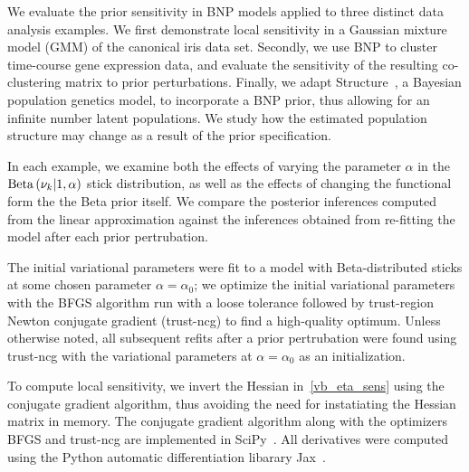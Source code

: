 We evaluate the prior sensitivity in BNP models applied to three distinct data analysis examples.
We first demonstrate local sensitivity in a Gaussian mixture model (GMM) of the canonical iris data set.
Secondly, we use BNP to cluster time-course gene expression data,
and evaluate the sensitivity of the resulting co-clustering matrix to prior perturbations.
Finally, we adapt Structure~\citep{pritchard:2000:structure}, a Bayesian population genetics model,
to incorporate a BNP prior, thus allowing for
an infinite number latent populations.
We study how the estimated population structure may change as a
result of the prior specification.

In each example, we examine both the effects of varying the parameter $\alpha$
in the $\mathrm{Beta}\left(\nu_{k} \vert 1, \alpha\right)$ stick distribution, as well as
the effects of changing the functional form the the Beta prior itself.
We compare the posterior inferences computed from the linear approximation against
the inferences obtained from re-fitting the model after each prior pertrubation.

The initial variational parameters were fit to a model
with Beta-distributed sticks at some chosen parameter $\alpha = \alpha_0$;
we optimize the initial variational parameters with
the BFGS algorithm run with a loose tolerance
followed by trust-region Newton conjugate gradient (trust-ncg) to find a high-quality optimum.
Unless otherwise noted, all subsequent refits after a prior pertrubation were found
using trust-ncg with the variational parameters at $\alpha = \alpha_0$ as an initialization.

To compute local sensitivity, we invert the Hessian in~\eqref{vb_eta_sens} using
the conjugate gradient algorithm, thus avoiding the need for
instatiating the Hessian matrix in memory.
The conjugate gradient algorithm along with the optimizers BFGS and trust-ncg
are implemented in SciPy~\citep{scipy}.
All derivatives were computed using the Python
automatic differentiation libarary Jax~\citep{jax2018github}.


